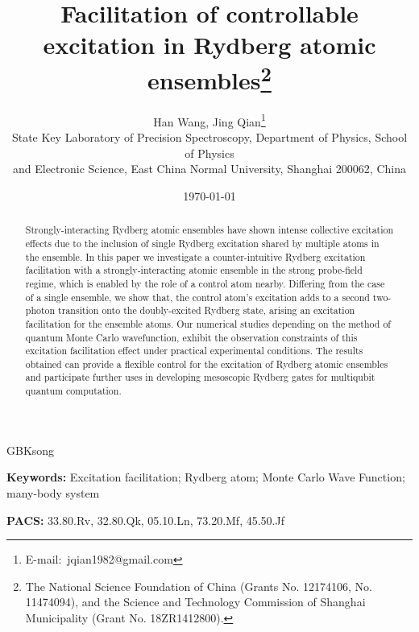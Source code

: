 \documentclass{cpbtex}
\begin{document}
\begin{CJK*}{GBK}{song}

\title{Facilitation of controllable excitation in Rydberg atomic ensembles\thanks{The National Science Foundation of China (Grants No. 12174106, No. 11474094), and the Science and Technology Commission of Shanghai Municipality (Grant No. 18ZR1412800).}}

\author{Han Wang, Jing Qian\thanks{E-mail:~jqian1982@gmail.com}\\
{State Key Laboratory of Precision Spectroscopy, Department of Physics, School of Physics}\\
{and Electronic Science, East China Normal University, Shanghai 200062, China}} %
\date{\today}
\maketitle
\begin{abstract}
    Strongly-interacting Rydberg atomic ensembles have shown intense collective excitation effects due to the inclusion of single Rydberg excitation shared by multiple atoms in the ensemble. In this paper we investigate a counter-intuitive Rydberg excitation facilitation with a strongly-interacting atomic ensemble in the strong probe-field regime, which is enabled by the role of a control atom nearby. Differing from the case of a single ensemble, we show that, the control atom's excitation adds to a second two-photon transition onto the doubly-excited Rydberg state, arising an excitation facilitation for the ensemble atoms. Our numerical studies depending on the method of quantum Monte Carlo wavefunction, exhibit the observation constraints of this excitation facilitation effect under practical experimental conditions. The results obtained can provide a flexible control for the excitation of Rydberg atomic ensembles and participate further uses in developing mesoscopic Rydberg gates for multiqubit quantum computation.
\end{abstract}


\textbf{Keywords:} Excitation facilitation; Rydberg atom; Monte Carlo Wave Function;  many-body system 

\textbf{PACS:} 33.80.Rv, 32.80.Qk, 05.10.Ln, 73.20.Mf, 45.50.Jf



\end{CJK*}
\end{document}
